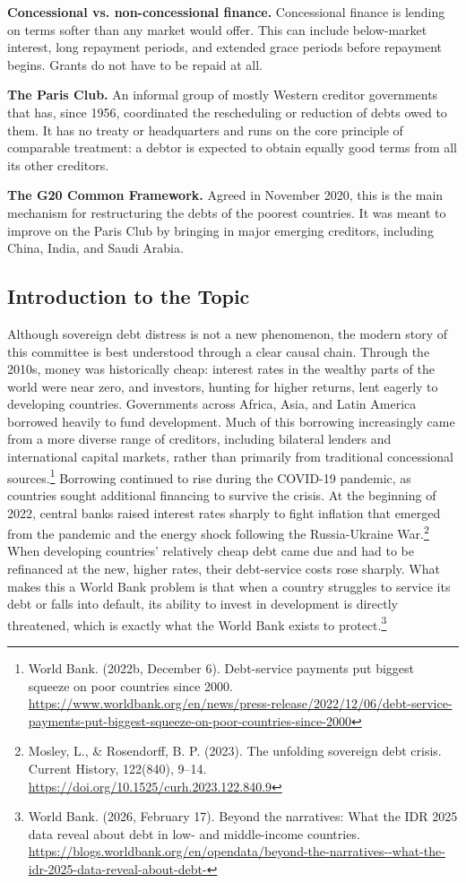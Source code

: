\textbf{Concessional vs. non-concessional finance.} Concessional finance is lending on terms softer than any market would offer. This can include below-market interest, long repayment periods, and extended grace periods before repayment begins. Grants do not have to be repaid at all.

\textbf{The Paris Club.} An informal group of mostly Western creditor governments that has, since 1956, coordinated the rescheduling or reduction of debts owed to them. It has no treaty or headquarters and runs on the core principle of comparable treatment: a debtor is expected to obtain equally good terms from all its other creditors.

\textbf{The G20 Common Framework.} Agreed in November 2020, this is the main mechanism for restructuring the debts of the poorest countries. It was meant to improve on the Paris Club by bringing in major emerging creditors, including China, India, and Saudi Arabia.

\subsection{Introduction to the Topic}

Although sovereign debt distress is not a new phenomenon, the modern story of this committee is best understood through a clear causal chain. Through the 2010s, money was historically cheap: interest rates in the wealthy parts of the world were near zero, and investors, hunting for higher returns, lent eagerly to developing countries. Governments across Africa, Asia, and Latin America borrowed heavily to fund development. Much of this borrowing increasingly came from a more diverse range of creditors, including bilateral lenders and international capital markets, rather than primarily from traditional concessional sources.\footnote{World Bank. (2022b, December 6). Debt-service payments put biggest squeeze on poor countries since 2000. \url{https://www.worldbank.org/en/news/press-release/2022/12/06/debt-service-payments-put-biggest-squeeze-on-poor-countries-since-2000}} Borrowing continued to rise during the COVID-19 pandemic, as countries sought additional financing to survive the crisis. At the beginning of 2022, central banks raised interest rates sharply to fight inflation that emerged from the pandemic and the energy shock following the Russia-Ukraine War.\footnote{Mosley, L., \& Rosendorff, B. P. (2023). The unfolding sovereign debt crisis. Current History, 122(840), 9–14. \url{https://doi.org/10.1525/curh.2023.122.840.9}} When developing countries’ relatively cheap debt came due and had to be refinanced at the new, higher rates, their debt-service costs rose sharply. What makes this a World Bank problem is that when a country struggles to service its debt or falls into default, its ability to invest in development is directly threatened, which is exactly what the World Bank exists to protect.\footnote{World Bank. (2026, February 17). Beyond the narratives: What the IDR 2025 data reveal about debt in low- and middle-income countries. \url{https://blogs.worldbank.org/en/opendata/beyond-the-narratives--what-the-idr-2025-data-reveal-about-debt-}}

